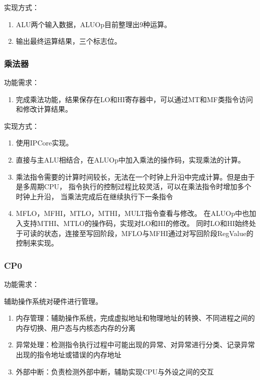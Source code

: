             实现方式：
            \begin{enumerate}
            \item
            ALU两个输入数据，ALUOp目前整理出9种运算。
            \item
            输出最终运算结果，三个标志位。
            \end{enumerate}

        \subsubsection{乘法器}
            功能需求：
            \begin{enumerate}
            \item
            完成乘法功能，结果保存在LO和HI寄存器中，可以通过MT和MF类指令访问和修改计算结果。
            \end{enumerate}

            实现方式：
            \begin{enumerate}
            \item
            使用IPCore实现。
            \item
            直接与主ALU相结合，在ALUOp中加入乘法的操作码，实现乘法的计算。
            \item
            乘法指令需要的计算时间较长，无法在一个时钟上升沿中完成计算。但是由于是多周期CPU，
            指令执行的控制过程比较灵活，可以在乘法指令时增加多个时钟上升沿，
            当乘法完成后在继续执行下一条指令
            \item
            MFLO，MFHI，MTLO，MTHI，MULT指令查看与修改。
            在ALUOp中也加入支持MTHI、MTLO的操作码，实现对LO和HI的修改。
            同时LO和HI始终处于可读的状态，连接至写回阶段，MFLO与MFHI通过对写回阶段RegValue的控制来实现。
            \end{enumerate}

        \subsubsection{CP0}
            功能需求：

            辅助操作系统对硬件进行管理。
            \begin{enumerate}
            \item
                内存管理：辅助操作系统，完成虚拟地址和物理地址的转换、不同进程之间的内存切换、用户态与内核态内存的分离
            \item
                异常处理：检测指令执行过程中可能出现的异常、对异常进行分类、记录异常出现的指令地址或错误的内存地址
            \item
                外部中断：负责检测外部中断，辅助实现CPU与外设之间的交互

            \end{enumerate}

